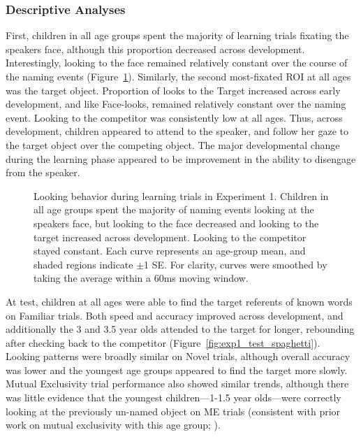 \documentclass[man,floatsintext]{apa6}
\begin{document}
\subsubsection{Descriptive Analyses}

First, children in all age groups spent the majority of learning trials fixating the speakers face, although this proportion decreased across development. Interestingly, looking to the face remained relatively constant over the course of the naming events (Figure~\ref{fig:exp1_train_spaghetti}). Similarly, the second most-fixated ROI at all ages was the target object. Proportion of looks to the Target increased across early development, and like Face-looks, remained relatively constant over the naming event. Looking to the competitor was consistently low at all ages. Thus, across development, children appeared to attend to the speaker, and follow her gaze to the target object over the competing object. The major developmental change during the learning phase appeared to be improvement in the ability to disengage from the speaker.

\begin{figure}[tb]
	\caption{\label{fig:exp1_train_spaghetti} Looking behavior during learning trials in Experiment 1. Children in all age groups spent the majority of naming events looking at the speakers face, but looking to the face decreased and looking to the target increased across development. Looking to the competitor stayed constant. Each curve represents an age-group mean, and shaded regions indicate $\pm$1 SE. For clarity, curves were smoothed by taking the average within a 60ms moving window.}
\end{figure}

At test, children at all ages were able to find the target referents of known words on Familiar trials. Both speed and accuracy improved across development, and additionally the 3 and 3.5 year olds attended to the target for longer, rebounding after checking back to the competitor (Figure~\ref{fig:exp1_test_spaghetti}). Looking patterns were broadly similar on Novel trials, although overall accuracy was lower and the youngest age groups appeared to find the target more slowly. Mutual Exclusivity trial performance also showed similar trends, although there was little evidence that the youngest children---1-1.5 year olds---were correctly looking at the previously un-named object on ME trials (consistent with prior work on mutual exclusivity with this age group; ).
\end{document}

